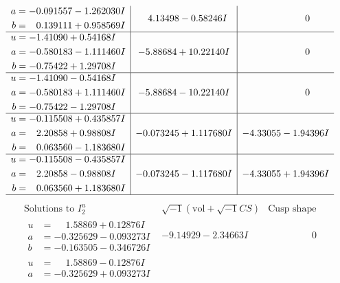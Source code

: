 \documentclass[1p]{elsarticle_modified}
\theoremstyle{definition}
\newcommand{\I}{\sqrt{-1}}
\begin{document}
$$\begin{array}{c|c|c}
\begin{aligned}
a &= -0.091557 - 1.262030 I \\
b &= \phantom{-}0.139111 + 0.958569 I\end{aligned}
 & \phantom{-}4.13498 - 0.58246 I & \phantom{-0.000000 } 0 \\ \hline\begin{aligned}
u &= -1.41090 + 0.54168 I \\
a &= -0.580183 - 1.111460 I \\
b &= -0.75422 + 1.29708 I\end{aligned}
 & -5.88684 + 10.22140 I & \phantom{-0.000000 } 0 \\ \hline\begin{aligned}
u &= -1.41090 - 0.54168 I \\
a &= -0.580183 + 1.111460 I \\
b &= -0.75422 - 1.29708 I\end{aligned}
 & -5.88684 - 10.22140 I & \phantom{-0.000000 } 0 \\ \hline\begin{aligned}
u &= -0.115508 + 0.435857 I \\
a &= \phantom{-}2.20858 + 0.98808 I \\
b &= \phantom{-}0.063560 - 1.183680 I\end{aligned}
 & -0.073245 + 1.117680 I & -4.33055 - 1.94396 I \\ \hline\begin{aligned}
u &= -0.115508 - 0.435857 I \\
a &= \phantom{-}2.20858 - 0.98808 I \\
b &= \phantom{-}0.063560 + 1.183680 I\end{aligned}
 & -0.073245 - 1.117680 I & -4.33055 + 1.94396 I\\
 \hline 
 \end{array}$$\newpage$$\begin{array}{c|c|c}  
\text{Solutions to }I^u_{2}& \I (\text{vol} + \sqrt{-1}CS) & \text{Cusp shape}\\
 \hline 
\begin{aligned}
u &= \phantom{-}1.58869 + 0.12876 I \\
a &= -0.325629 - 0.093273 I \\
b &= -0.163505 - 0.346726 I\end{aligned}
 & -9.14929 - 2.34663 I & \phantom{-0.000000 } 0 \\ \hline\begin{aligned}
u &= \phantom{-}1.58869 - 0.12876 I \\
a &= -0.325629 + 0.093273 I \\

\end{aligned}
\end{array}$$
\end{document}
